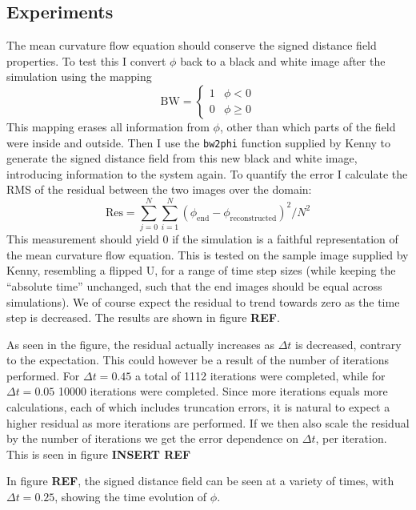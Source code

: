 \documentclass[sigconf]{acmart}
\begin{document}
\subsection{Experiments}
The mean curvature flow equation should conserve the signed distance field properties. To test this I convert $ \phi $ back to a black and white image after the simulation using the mapping
\begin{equation}\label{key}
	\text{BW} = \begin{cases}
	1 & \phi < 0 \\
	0 & \phi \geq 0
	\end{cases}
\end{equation}
This mapping erases all information from $ \phi $, other than which parts of the field were inside and outside. Then I use the \texttt{bw2phi} function supplied by Kenny to generate the signed distance field from this new black and white image, introducing information to the system again. To quantify the error I calculate the RMS of the residual between the two images over the domain:
\begin{equation}\label{key}
	\text{Res} = \sum_{j=0}^N \sum_{i=1}^{N} (\phi_{\text{end}} - \phi_{\text{reconstructed}})^2 / N^2
\end{equation} 
This measurement should yield 0 if the simulation is a faithful representation of the mean curvature flow equation. This is tested on the sample image supplied by Kenny, resembling a flipped U, for a range of time step sizes (while keeping the ``absolute time'' unchanged, such that the end images should be equal across simulations). We of course expect the residual to trend towards zero as the time step is decreased. The results are shown in figure \textbf{REF}.

As seen in the figure, the residual actually increases as $ \Delta t $ is decreased, contrary to the expectation. This could however be a result of the number of iterations performed. For $ \Delta t = 0.45 $ a total of 1112 iterations were completed, while for $ \Delta t = 0.05 $ 10000 iterations were completed. Since more iterations equals more calculations, each of which includes truncation errors, it is natural to expect a higher residual as more iterations are performed. If we then also scale the residual by the number of iterations we get the error dependence on $ \Delta t $, per iteration. This is seen in figure \textbf{INSERT REF}

In figure \textbf{REF}, the signed distance field can be seen at a variety of times, with $ \Delta t=0.25 $, showing the time evolution of $ \phi $.
\end{document}
